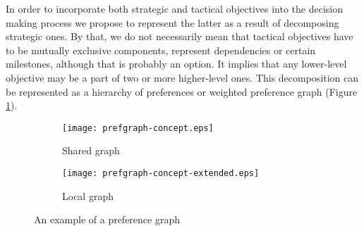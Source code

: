 





In order to incorporate both strategic and tactical objectives into the decision making process we propose to represent
the latter as a result of decomposing strategic ones. By that, we do not necessarily mean that tactical objectives have
to be mutually exclusive components, represent dependencies or certain milestones, although that is probably an option.
It implies that any lower-level objective may be a part of two or more higher-level ones. This decomposition can be
represented as a hierarchy of preferences or weighted preference graph (Figure \ref{fig:prefgraph-concept-shared}).

\begin{figure}[hbt!]
    \centering
    \begin{subfigure}{.45\linewidth}
        \texttt{[image: prefgraph-concept.eps]}
        \caption{Shared graph}\label{fig:prefgraph-concept-shared}
    \end{subfigure}
    \begin{subfigure}{.45\linewidth}
        \texttt{[image: prefgraph-concept-extended.eps]}
        \caption{Local graph}\label{fig:prefgraph-concept-local}
    \end{subfigure}

    \caption{\small An example of a preference graph}
    \label{fig:prefgraph-concept}
\end{figure}

